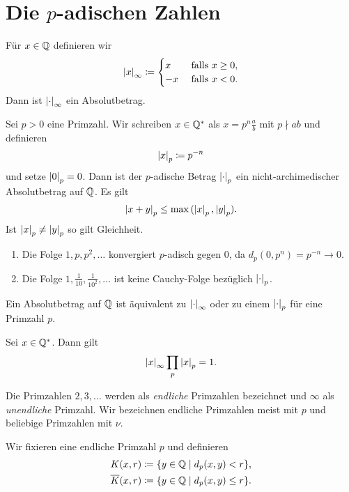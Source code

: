 \chapter{Die $p$-adischen Zahlen}
Für $x\in \mathbb{Q}$ definieren wir
\begin{align*}
\left\vert x\right\vert_\infty\coloneqq\begin{cases}
x &\text{ falls } x\geq 0,\\
-x &\text{ falls } x<0.
\end{cases}
\end{align*}
Dann ist $\left\vert\cdot\right\vert_\infty$ ein Absolutbetrag.

Sei $p>0$ eine Primzahl. Wir schreiben $x\in \mathbb{Q}^\ast$ als $x=p^n \frac{a}{b}$ mit $p \nmid ab$ und definieren
\begin{align*}
\left\vert x\right\vert_p \coloneqq p^{-n}
\end{align*}
und setze $\left\vert0\right\vert_p=0$.
Dann ist der $p$-adische Betrag $\left\vert\cdot\right\vert_p$ ein nicht-archimedischer Absolutbetrag auf $\mathbb{Q}$.
Es gilt
\begin{align*}
\left\vert x+y\right\vert_p\leq \max{(\left\vert x\right\vert_p,\left\vert y\right\vert_p)}.
\end{align*}
Ist $\left\vert x\right\vert_p \not= \left\vert y\right\vert_p$ so gilt Gleichheit.
\begin{bsp}

\begin{enumerate}[label=\roman*)]
\item Die Folge $1,p,p^2,\dots$ konvergiert $p$-adisch gegen $0$, da $d_p(0,p^n)=p^{-n}\to 0$.
\item Die Folge $1,\frac{1}{10},\frac{1}{10^2},\dots$ ist keine Cauchy-Folge bezüglich $\left\vert\cdot\right\vert_p$.
\end{enumerate}
\end{bsp}

\begin{thm}[Ostrowski]
Ein Absolutbetrag auf $\mathbb{Q}$ ist äquivalent zu $\left\vert\cdot\right\vert_\infty$ oder zu einem $\left\vert\cdot\right\vert_p$ für eine Primzahl $p$.
\end{thm}

\begin{satz}[Produktformel]
Sei $x\in \mathbb{Q}^\ast$. Dann gilt
\begin{align*}
\left\vert x\right\vert_\infty \prod_p \left\vert x\right\vert_p=1.
\end{align*}
\end{satz}

\begin{bem}
Die Primzahlen $2,3,\dots$ werden als \emph{endliche} Primzahlen bezeichnet und $\infty$ als \emph{unendliche} Primzahl.
Wir bezeichnen endliche Primzahlen meist mit $p$ und beliebige Primzahlen mit $\nu$.
\end{bem}

\begin{defi}
Wir fixieren eine endliche Primzahl $p$ und definieren
\begin{align*}
K(x,r)\coloneqq\{y \in \mathbb{Q} \mid d_p(x,y)<r\},\\
\overline{K}(x,r) \coloneqq \{y\in \mathbb{Q} \mid d_p(x,y)\leq r\}.
\end{align*}
\end{defi}
